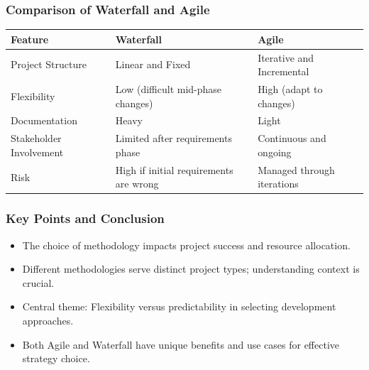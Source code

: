 \documentclass{beamer}
\begin{document}
\begin{frame}[fragile]
    \frametitle{Comparison of Waterfall and Agile}
    \begin{table}[]
        \centering
        \begin{tabular}{|l|l|l|}
            \hline
            \textbf{Feature} & \textbf{Waterfall} & \textbf{Agile} \\ \hline
            Project Structure         & Linear and Fixed                & Iterative and Incremental        \\ \hline
            Flexibility               & Low (difficult mid-phase changes) & High (adapt to changes)         \\ \hline
            Documentation             & Heavy                           & Light                            \\ \hline
            Stakeholder Involvement   & Limited after requirements phase & Continuous and ongoing           \\ \hline
            Risk                      & High if initial requirements are wrong & Managed through iterations     \\ \hline
        \end{tabular}
    \end{table}
\end{frame}

\begin{frame}[fragile]
    \frametitle{Key Points and Conclusion}
    \begin{itemize}
        \item The choice of methodology impacts project success and resource allocation.
        \item Different methodologies serve distinct project types; understanding context is crucial.
        \item Central theme: Flexibility versus predictability in selecting development approaches.
        \item Both Agile and Waterfall have unique benefits and use cases for effective strategy choice.
    \end{itemize}
\end{frame}
\end{document}
